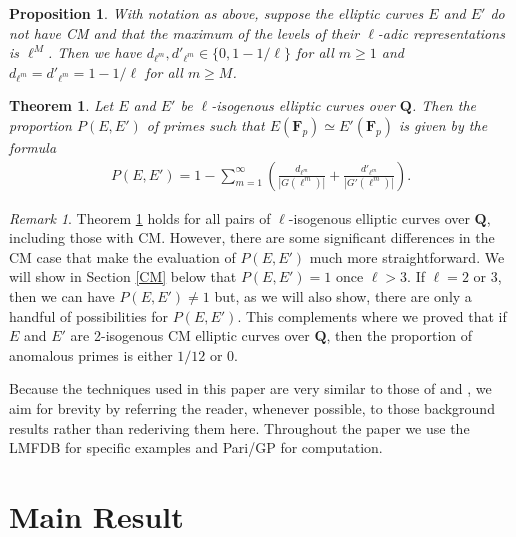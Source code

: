 \documentclass{amsart}
\newcommand{\F}{\mathbf{F}}
\newcommand{\Q}{\mathbf{Q}}
\numberwithin{equation}{section}
\theoremstyle{plain}
\newtheorem{thm}[equation]{Theorem}
\newtheorem{prop}[equation]{Proposition}
\theoremstyle{remark}
\newtheorem{rmk}[equation]{Remark}
\begin{document}
\begin{prop} \label{dmpropintro}
With notation as above, suppose the elliptic curves $E$ and $E'$ do not have CM and  that the maximum of the levels of their $\ell$-adic representations is $\ell^M$.  Then we have $d_{\ell^m}, d'_{\ell^m} \in \lbrace 0,1 - 1/\ell  \rbrace$ for all $m \geq 1$ and $d_{\ell^m} = d'_{\ell^m} = 1-1/\ell$ for all $m \geq M$.
\end{prop}

\begin{thm} \label{main_thm}
Let $E$ and $E'$ be $\ell$-isogenous elliptic curves over $\Q$.  Then the proportion $P(E,E')$ of primes such that $E(\F_p) \simeq E'(\F_p)$ is given by the formula
\begin{align} \label{main_form}
P(E,E') = 1-\sum_{m = 1}^\infty \left( \frac{d_{\ell^m}}{|G(\ell^m)|}  +  \frac{d'_{\ell^m}}{|G'(\ell^m)|}\right).
\end{align}
\end{thm}

\begin{rmk} \label{cmrmk}
Theorem \ref{main_thm} holds for all pairs of $\ell$-isogenous elliptic curves over $\Q$, including those with CM.  However, there are some significant differences in the CM case that make the evaluation of $P(E,E')$ much more straightforward.  We will show in Section \ref{CM} below that $P(E,E') =1$ once $\ell >3$.  If $\ell = 2$ or 3, then we can have $P(E,E') \ne 1$ but, as we will also show, there are only a handful of possibilities for $P(E,E')$.  This complements \cite[Thm.~1.11]{rnt} where we proved that if $E$ and $E'$ are 2-isogenous CM elliptic curves over $\Q$, then the proportion of anomalous primes is either $1/12$ or 0.
\end{rmk}

Because the techniques used in this paper are very similar to those of \cite{ck} and \cite{rnt}, we aim for brevity by referring the reader, whenever possible, to those background results rather than rederiving them here.  Throughout the paper we use the LMFDB \cite{lmfdb} for specific examples and Pari/GP \cite{PARI} for computation.

\section{Main Result} \label{main_section}
\end{document}
